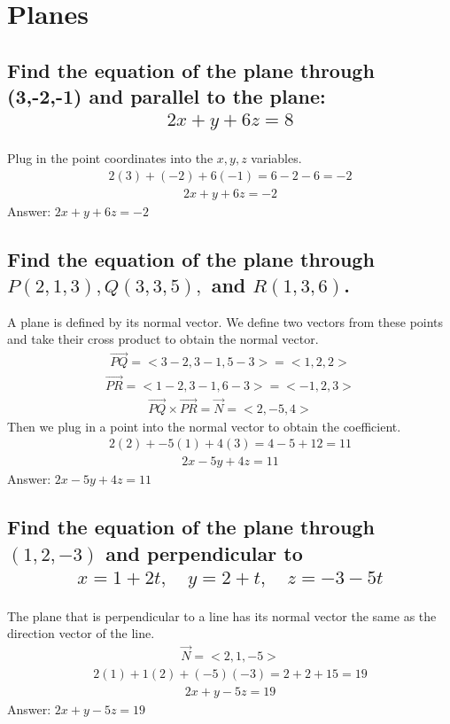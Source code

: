 \documentclass{article}
\begin{document}
\section{Planes}

\subsection{Find the equation of the plane through (3,-2,-1) and parallel to the plane:
	\begin{align*}
		2x + y + 6z = 8
	\end{align*}
}
Plug in the point coordinates into the $x, y, z$ variables. 
\begin{align*}
	2(3) + (-2) + 6(-1) = 6 - 2 - 6 = -2
\end{align*}
\begin{align*}
	2x + y + 6z = -2
\end{align*}
Answer: $2x + y + 6z = -2$

\subsection{Find the equation of the plane through $P(2,1,3), Q(3,3,5),$ and $R(1,3,6)$.}
A plane is defined by its normal vector. We define two vectors from these points and take their cross product to obtain the normal vector.
\begin{align*}
	\vec{PQ} = <3 - 2, 3 - 1, 5 - 3> = <1, 2, 2>
\end{align*}
\begin{align*}
	\vec{PR} = <1 - 2, 3 - 1, 6 - 3> = <-1, 2, 3>
\end{align*}
\begin{align*}
	\vec{PQ} \times \vec{PR} = \vec{N} = <2, -5, 4>
\end{align*}
Then we plug in a point into the normal vector to obtain the coefficient. 
\begin{align*}
	2(2) + -5(1) + 4(3) = 4 - 5 + 12 = 11
\end{align*}
\begin{align*}
	2x - 5y + 4z = 11
\end{align*}
Answer: $2x - 5y + 4z = 11$

\subsection{Find the equation of the plane through $(1, 2, -3)$ and perpendicular to
	\begin{align*}
		x = 1 + 2t, \quad y = 2 + t, \quad z = -3 - 5t
	\end{align*}
}
The plane that is perpendicular to a line has its normal vector the same as the direction vector of the line.
\begin{align*}
	\vec{N} = <2, 1, -5>
\end{align*}
\begin{align*}
	2(1) + 1(2) + (-5)(-3) = 2 + 2 + 15 = 19
\end{align*}
\begin{align*}
	2x + y - 5z = 19
\end{align*}
Answer: $2x + y - 5z = 19$
\end{document}
